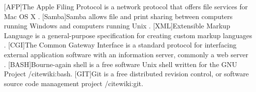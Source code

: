 \documentclass[a4paper,10pt,twoside,headings=small,bibliography=totocnumbered,headsepline]{scrartcl}
\begin{document}
\begin{appendix}
\begin{acronym}
[AFP]{The Apple Filing Protocol is a network protocol that offers file services for Mac OS X \cite{wiki:afp}.}
[Samba]{Samba allows file and print sharing between computers running Windows and computers running Unix \cite{wiki:samba}.}
[XML]{Extensible Markup Language is a general-purpose specification for creating custom markup languages \cite{wiki:xml}.}
[CGI]{The Common Gateway Interface is a standard protocol for interfacing external application software with an information server, commonly a web server \cite{wiki:cgi}.}
[BASH]{Bourne-again shell is a free software Unix shell written for the GNU Project /cite{wiki:bash}.}
[GIT]{Git is a free distributed revision control, or software source code management project /cite{wiki:git}.}
\end{acronym}

\end{appendix}
\end{document}
